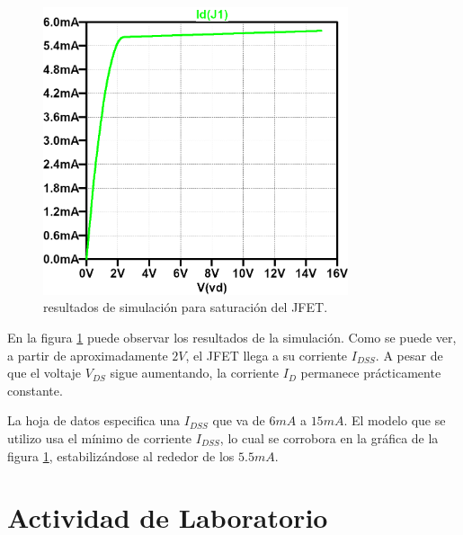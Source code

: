     \begin{figure}[!ht]
      \centering
      \includegraphics[width=0.8\textwidth]{images/saturacion-id_vds.png}
      \caption{resultados de simulación para saturación del JFET.}
      \label{fig:sim.sat}
    \end{figure}
    En la figura \ref{fig:sim.sat} puede observar los resultados de la simulación. Como se puede ver, a partir de
    aproximadamente $2V$, el JFET llega a su corriente $I_{DSS}$. A pesar de que el voltaje $V_{DS}$ sigue aumentando, la
    corriente $I_D$ permanece prácticamente constante.

    La hoja de datos especifica una $I_{DSS}$ que va de $6mA$ a $15mA$. El modelo que se utilizo usa el mínimo de
    corriente $I_{DSS}$, lo cual se corrobora en la gráfica de la figura \ref{fig:sim.sat}, estabilizándose al rededor
    de los $5.5mA$.

  \section{Actividad de Laboratorio}
